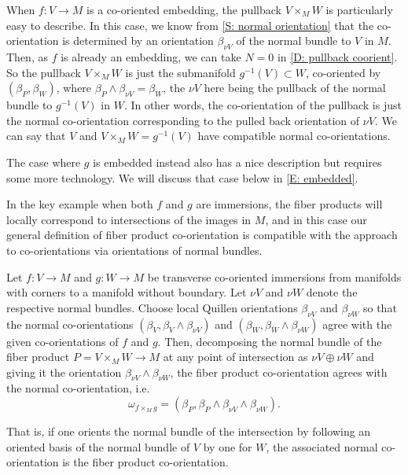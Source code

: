 \begin{example}\label{E: V embedded}
	When $f \colon V \to M$ is a co-oriented embedding, the pullback $V \times_M W$ is particularly easy to describe.
	In this case, we know from \cref{S: normal orientation} that the co-orientation is determined by an orientation $\beta_{\nu V}$ of the normal bundle to $V$ in $M$.
	Then, as $f$ is already an embedding, we can take $N = 0$ in \cref{D: pullback coorient}.
	So the pullback $V \times_M W$ is just the submanifold $g^{-1}(V) \subset W$, co-oriented by $(\beta_P,\beta_W)$, where $\beta_P \wedge \beta_{\nu V} = \beta_W$, the $\nu V$ here being the pullback of the normal bundle to $g^{-1}(V)$ in $W$.
	In other words, the co-orientation of the pullback is just the normal co-orientation corresponding to the pulled back orientation of $\nu V$.
	We can say that $V$ and $V \times_M W = g^{-1}(V)$ have compatible normal co-orientations.

	The case where $g$ is embedded instead also has a nice description but requires some more technology.
	We will discuss that case below in \cref{E: embedded}.
\end{example}

In the key example when both $f$ and $g$ are immersions, the fiber products will locally correspond to intersections of the images in $M$, and in this case our general definition of fiber product co-orientation is compatible with the approach to co-orientations via orientations of normal bundles.

\begin{proposition}\label{P: normal pullback}
	Let $f \colon V \to M$ and $g \colon W \to M$ be transverse co-oriented immersions from manifolds with corners to a manifold without boundary.
	Let $\nu V$ and $\nu W$ denote the respective normal bundles.
	Choose local Quillen orientations $\beta_{\nu V}$ and $\beta_{\nu W}$ so that the normal co-orientations $(\beta_V, \beta_V \wedge \beta_{\nu V})$ and $(\beta_W, \beta_W \wedge \beta_{\nu W})$ agree with the given co-orientations of $f$ and $g$.
	Then, decomposing the normal bundle of the fiber product $P = V \times_M W \to M$ at any point of intersection as $\nu V \oplus \nu W$ and giving it the orientation $\beta_{\nu V} \wedge \beta_{\nu W}$, the fiber product co-orientation agrees with the normal co-orientation, i.e.\
	$$\omega_{f \times_M g} = (\beta_P,\beta_P \wedge \beta_{\nu V} \wedge \beta_{\nu W}).$$
\end{proposition}

That is, if one orients the normal bundle of the intersection by following an oriented basis of the normal bundle of $V$ by one for $W$, the associated normal co-orientation is the fiber product co-orientation.


